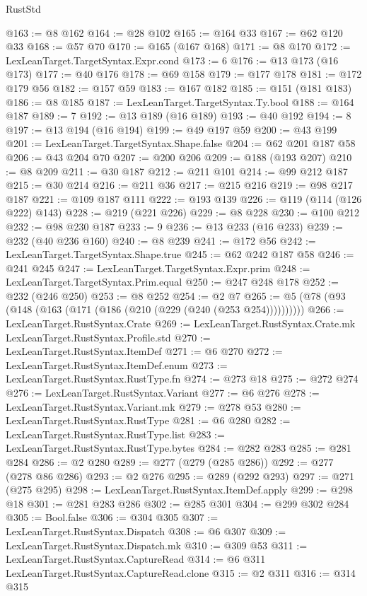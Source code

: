 \begin{lexlean}{RustStd}
\begin{coremodule}
@163 := @8 @162
@164 := @28 @102
@165 := @164 @33
@167 := @62 @120 @33
@168 := @57 @70
@170 := @165 (@167 @168)
@171 := @8 @170
@172 := LexLeanTarget.TargetSyntax.Expr.cond
@173 := 6
@176 := @13 @173 (@16 @173)
@177 := @40 @176
@178 := @69 @158
@179 := @177 @178
@181 := @172 @179 @56
@182 := @157 @59
@183 := @167 @182
@185 := @151 (@181 @183)
@186 := @8 @185
@187 := LexLeanTarget.TargetSyntax.Ty.bool
@188 := @164 @187
@189 := 7
@192 := @13 @189 (@16 @189)
@193 := @40 @192
@194 := 8
@197 := @13 @194 (@16 @194)
@199 := @49 @197 @59
@200 := @43 @199
@201 := LexLeanTarget.TargetSyntax.Shape.false
@204 := @62 @201 @187 @58
@206 := @43 @204 @70
@207 := @200 @206
@209 := @188 (@193 @207)
@210 := @8 @209
@211 := @30 @187
@212 := @211 @101
@214 := @99 @212 @187
@215 := @30 @214
@216 := @211 @36
@217 := @215 @216
@219 := @98 @217 @187
@221 := @109 @187 @111
@222 := @193 @139
@226 := @119 (@114 (@126 @222) @143)
@228 := @219 (@221 @226)
@229 := @8 @228
@230 := @100 @212
@232 := @98 @230 @187
@233 := 9
@236 := @13 @233 (@16 @233)
@239 := @232 (@40 @236 @160)
@240 := @8 @239
@241 := @172 @56
@242 := LexLeanTarget.TargetSyntax.Shape.true
@245 := @62 @242 @187 @58
@246 := @241 @245
@247 := LexLeanTarget.TargetSyntax.Expr.prim
@248 := LexLeanTarget.TargetSyntax.Prim.equal
@250 := @247 @248 @178
@252 := @232 (@246 @250)
@253 := @8 @252
@254 := @2 @7
@265 := @5 (@78 (@93 (@148 (@163 (@171 (@186 (@210 (@229 (@240 (@253 @254))))))))))
@266 := LexLeanTarget.RustSyntax.Crate
@269 := LexLeanTarget.RustSyntax.Crate.mk LexLeanTarget.RustSyntax.Profile.std
@270 := LexLeanTarget.RustSyntax.ItemDef
@271 := @6 @270
@272 := LexLeanTarget.RustSyntax.ItemDef.enum
@273 := LexLeanTarget.RustSyntax.RustType.fn
@274 := @273 @18
@275 := @272 @274
@276 := LexLeanTarget.RustSyntax.Variant
@277 := @6 @276
@278 := LexLeanTarget.RustSyntax.Variant.mk
@279 := @278 @53
@280 := LexLeanTarget.RustSyntax.RustType
@281 := @6 @280
@282 := LexLeanTarget.RustSyntax.RustType.list
@283 := LexLeanTarget.RustSyntax.RustType.bytes
@284 := @282 @283
@285 := @281 @284
@286 := @2 @280
@289 := @277 (@279 (@285 @286))
@292 := @277 (@278 @86 @286)
@293 := @2 @276
@295 := @289 (@292 @293)
@297 := @271 (@275 @295)
@298 := LexLeanTarget.RustSyntax.ItemDef.apply
@299 := @298 @18
@301 := @281 @283 @286
@302 := @285 @301
@304 := @299 @302 @284
@305 := Bool.false
@306 := @304 @305
@307 := LexLeanTarget.RustSyntax.Dispatch
@308 := @6 @307
@309 := LexLeanTarget.RustSyntax.Dispatch.mk
@310 := @309 @53
@311 := LexLeanTarget.RustSyntax.CaptureRead
@314 := @6 @311 LexLeanTarget.RustSyntax.CaptureRead.clone
@315 := @2 @311
@316 := @314 @315

\end{coremodule}
\end{lexlean}
